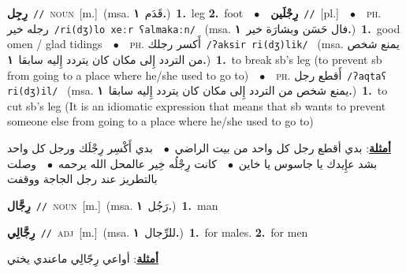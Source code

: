 \documentclass[10pt,a4paper,twoside]{article} %
\begin{document}
\begin{multicols}{2}
{\setlength\topsep{0pt}\textbf{\foreignlanguage{arabic}{رِجِل}}\ {\color{gray}\texttt{//}\color{black}}\ \textsc{noun}\ [m.]\ \color{gray}(msa. \foreignlanguage{arabic}{قَدَم}~\foreignlanguage{arabic}{\textbf{١.}})\color{black}\ \textbf{1.}~leg  \textbf{2.}~foot\ \ $\bullet$\ \ \setlength\topsep{0pt}\textbf{\foreignlanguage{arabic}{رِجْلَين}}\ {\color{gray}\texttt{//}\color{black}}\ [pl.]\ \ $\bullet$\ \ \textsc{ph.} \color{gray} \foreignlanguage{arabic}{رجله خير}\color{black}\ {\color{gray}\texttt{/{\sffamily ri(dʒ)lo xeːr ʕalmakaːn}/}\color{black}}\ \color{gray} (msa. \foreignlanguage{arabic}{فال حَسَن وبشارَة خير}~\foreignlanguage{arabic}{\textbf{١.}})\color{black}\ \textbf{1.}~good omen / glad tidings\ \ $\bullet$\ \ \textsc{ph.} \color{gray} \foreignlanguage{arabic}{أَكسر رجلك}\color{black}\ {\color{gray}\texttt{/{\sffamily ʔaksir ri(dʒ)lik}/}\color{black}}\ \color{gray} (msa. \foreignlanguage{arabic}{يمنع شخص من التردد إِلى مكان كان يتردد إِليه سابقا}~\foreignlanguage{arabic}{\textbf{١.}})\color{black}\ \textbf{1.}~to break sb's leg (to prevent sb from going to a place where he/she used to go to)\ \ $\bullet$\ \ \textsc{ph.} \color{gray} \foreignlanguage{arabic}{أَقطع رجل}\color{black}\ {\color{gray}\texttt{/{\sffamily ʔaqtaʕ ri(dʒ)il}/}\color{black}}\ \color{gray} (msa. \foreignlanguage{arabic}{يمنع شخص من التردد إِلى مكان كان يتردد إِليه سابقا}~\foreignlanguage{arabic}{\textbf{١.}})\color{black}\ \textbf{1.}~to cut sb's leg (It is an idiomatic expression that means that sb wants to prevent someone else from going to a place where he/she used to go to)\  \begin{flushright}\color{gray}\foreignlanguage{arabic}{\textbf{\underline{\foreignlanguage{arabic}{أمثلة}}}: بدي أقطع رجل كل واحد من بيت الراضي\ $\bullet$\ \  بدي أَكْسِر رِجْلَك ورجل كل واحد بشد عإِيدك يا جاسوس يا خاين\ $\bullet$\ \  كانت رِجْلُه خِير عالمحل الله يرحمه\ $\bullet$\ \  وصلت بالتطريز عند رجل الجاجة ووقفت}\end{flushright}\color{black}} \vspace{2mm}

{\setlength\topsep{0pt}\textbf{\foreignlanguage{arabic}{رِجَّال}}\ {\color{gray}\texttt{//}\color{black}}\ \textsc{noun}\ [m.]\ \color{gray}(msa. \foreignlanguage{arabic}{رَجُل}~\foreignlanguage{arabic}{\textbf{١.}})\color{black}\ \textbf{1.}~man\ } \vspace{2mm}

{\setlength\topsep{0pt}\textbf{\foreignlanguage{arabic}{رِجَّالِي}}\ {\color{gray}\texttt{//}\color{black}}\ \textsc{adj}\ [m.]\ \color{gray}(msa. \foreignlanguage{arabic}{للرِّجال}~\foreignlanguage{arabic}{\textbf{١.}})\color{black}\ \textbf{1.}~for males.  \textbf{2.}~for men\  \begin{flushright}\color{gray}\foreignlanguage{arabic}{\textbf{\underline{\foreignlanguage{arabic}{أمثلة}}}: أواعي رِجّالِي ماعندي يختي}\end{flushright}\color{black}} \vspace{2mm}


\end{multicols}
\end{document}

